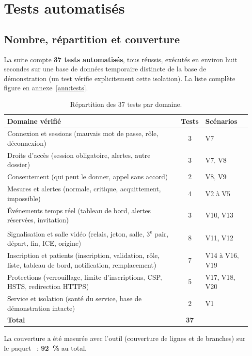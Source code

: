 \section{Tests automatisés}

\subsection{Nombre, répartition et couverture}

La suite compte \textbf{37 tests automatisés}, tous réussis, exécutés en environ huit secondes sur une base de données temporaire distincte de la base de démonstration (un test vérifie explicitement cette isolation). La liste complète figure en annexe~\ref{ann:tests}.

\begin{table}[H]
\centering
\caption{Répartition des 37 tests par domaine.}
\label{tab:repartition}
\begin{tabularx}{\textwidth}{@{}X c l@{}}
\toprule
\textbf{Domaine vérifié} & \textbf{Tests} & \textbf{Scénarios} \\
\midrule
Connexion et sessions (mauvais mot de passe, rôle, déconnexion) & 3 & V7 \\
Droits d'accès (session obligatoire, alertes, autre dossier) & 3 & V7, V8 \\
Consentement (qui peut le donner, appel sans accord) & 2 & V8, V9 \\
Mesures et alertes (normale, critique, acquittement, impossible) & 4 & V2 à V5 \\
Événements temps réel (tableau de bord, alertes réservées, invitation) & 3 & V10, V13 \\
Signalisation et salle vidéo (relais, jeton, salle, 3\textsuperscript{e} pair, départ, fin, \ac{ICE}, origine) & 8 & V11, V12 \\
Inscription et patients (inscription, validation, rôle, liste, tableau de bord, notification, remplacement) & 7 & V14 à V16, V19 \\
Protections (verrouillage, limite d'inscriptions, \ac{CSP}, \ac{HSTS}, redirection \ac{HTTPS}) & 5 & V17, V18, V20 \\
Service et isolation (santé du service, base de démonstration intacte) & 2 & V1 \\
\midrule
\textbf{Total} & \textbf{37} & \\
\bottomrule
\end{tabularx}
\end{table}

La couverture a été mesurée avec l'outil  (couverture de lignes et de branches) sur le paquet ~: \textbf{92~\%} au total.

